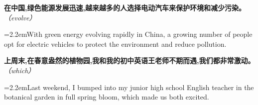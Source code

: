 \documentclass[11pt,a4paper]{article}
\newcommand{\num}[1]{\makebox[1.9em][r]{#1.}\hspace{0.3em}}
\newcommand{\prompt}[1]{\emph{\textcolor{tipblue}{\small（#1）}}}
\begin{document}
\begin{minipage}{\linewidth}

\num{39}\textbf{在中国,绿色能源发展迅速,越来越多的人选择电动汽车来保护环境和减少污染。}\prompt{evolve}

\vspace{0.15em}

\noindent\hangindent=2.2em\hspace{2.2em}With green energy evolving rapidly in China, a growing number of people opt for electric vehicles to protect the environment and reduce pollution.

\end{minipage}

\begin{minipage}{\linewidth}

\num{40}\textbf{上周末,在春意盎然的植物园,我和我的初中英语王老师不期而遇,我们都非常激动。}\prompt{which}

\vspace{0.15em}

\noindent\hangindent=2.2em\hspace{2.2em}Last weekend, I bumped into my junior high school English teacher in the botanical garden in full spring bloom, which made us both excited.

\end{minipage}
\end{document}
